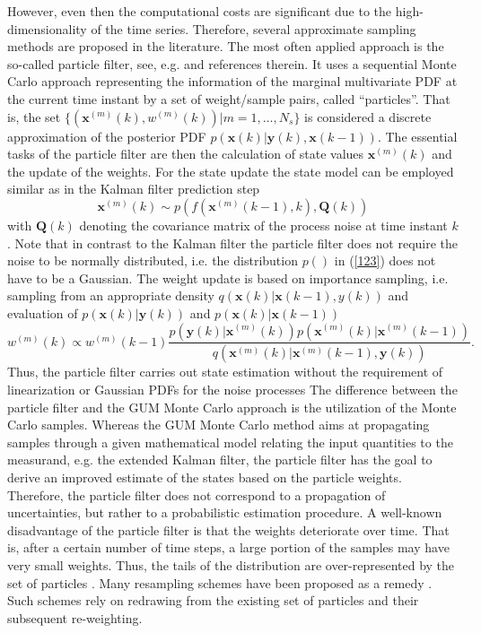 \documentclass[10pt]{article}
\begin{document}
\begin{spacing}{1}
However, even then the computational costs are significant due to the high-dimensionality of the time series. Therefore, several approximate sampling methods are proposed in the literature. The most often applied approach is the so-called particle filter, see, e.g. \cite{Garcia:2013kq, Candy, Wang:2007ik} and references therein. It uses a sequential Monte Carlo approach representing the information of the marginal multivariate PDF at the current time instant by a set of weight/sample pairs, called ``particles''. That is, the set $\{ (\bm{x}^{(m)}(k), w^{(m)}(k)) \vert m=1,\ldots,N_s\}$ is considered a discrete approximation of the posterior PDF $p(\bm{x}(k) \vert \bm{y}(k),\bm{x}(k-1))$. The essential tasks of the particle filter are then the calculation of state values $\bm{x}^{(m)}(k)$ and the update of the weights. For the state update the state model can be employed similar as in the Kalman filter prediction step
\begin{equation}\label{123}
	\bm{x}^{(m)}(k) \sim p(f(\bm{x}^{(m)}(k-1),k), \bm{Q}(k))
\end{equation}
with $\bm{Q}(k)$ denoting the covariance matrix of the process noise at time instant $k$. Note that in contrast to the Kalman filter the particle filter does not require the noise to be normally distributed, i.e. the distribution $p()$ in (\ref{123}) does not have to be a Gaussian.
The weight update is based on importance sampling, i.e. sampling from an appropriate density $q(\bm{x}(k)\vert \bm{x}(k-1),y(k))$ and evaluation of $p(\bm{x}(k)\vert \bm{y}(k))$ and $p(\bm{x}(k)\vert \bm{x}(k-1))$
\begin{equation}
	w^{(m)}(k) \propto w^{(m)}(k-1) \frac{p(\bm{y}(k)\vert \bm{x}^{(m)}(k))p(\bm{x}^{(m)}(k)\vert \bm{x}^{(m)}(k-1))}{q(\bm{x}^{(m)}(k)\vert\bm{x}^{(m)}(k-1), \bm{y}(k) )} .
\end{equation}
Thus, the particle filter carries out state estimation without the requirement of linearization or Gaussian PDFs for the noise processes The difference between the particle filter and the GUM Monte Carlo approach is the utilization of the Monte Carlo samples. Whereas the GUM Monte Carlo method aims at propagating samples through a given mathematical model relating the input quantities to the measurand, e.g. the extended Kalman filter, the particle filter has the goal to derive an improved estimate of the states based on the particle weights. Therefore, the particle filter does not correspond to a propagation of uncertainties, but rather to a probabilistic estimation procedure. 
A well-known disadvantage of the particle filter is that the weights deteriorate over time. That is, after a certain number of time steps, a large portion of the samples may have very small weights. Thus, the tails of the distribution are over-represented by the set of particles \cite{Candy}. Many resampling schemes have been proposed as a remedy \cite{Douc:2005}. Such schemes rely on redrawing from the existing set of particles and their subsequent re-weighting. 


\end{spacing}
\end{document}
